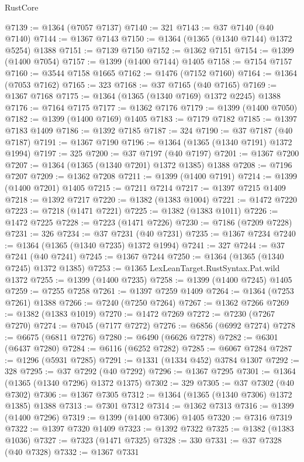\begin{lexlean}{RustCore}
\begin{coremodule}
@7139 := @1364 (@7057 @7137)
@7140 := 321
@7143 := @37 @7140 (@40 @7140)
@7144 := @1367 @7143
@7150 := @1364 (@1365 (@1340 @7144) @1372 @5254) @1388
@7151 := @7139 @7150
@7152 := @1362 @7151
@7154 := @1399 (@1400 @7054)
@7157 := @1399 (@1400 @7144) @1405
@7158 := @7154 @7157
@7160 := @3544 @7158 @1665
@7162 := @1476 (@7152 @7160)
@7164 := @1364 (@7053 @7162)
@7165 := 323
@7168 := @37 @7165 (@40 @7165)
@7169 := @1367 @7168
@7175 := @1364 (@1365 (@1340 @7169) @1372 @2245) @1388
@7176 := @7164 @7175
@7177 := @1362 @7176
@7179 := @1399 (@1400 @7050)
@7182 := @1399 (@1400 @7169) @1405
@7183 := @7179 @7182
@7185 := @1397 @7183 @1409
@7186 := @1392 @7185
@7187 := 324
@7190 := @37 @7187 (@40 @7187)
@7191 := @1367 @7190
@7196 := @1364 (@1365 (@1340 @7191) @1372 @1994)
@7197 := 325
@7200 := @37 @7197 (@40 @7197)
@7201 := @1367 @7200
@7207 := @1364 (@1365 (@1340 @7201) @1372 @1385) @1388
@7208 := @7196 @7207
@7209 := @1362 @7208
@7211 := @1399 (@1400 @7191)
@7214 := @1399 (@1400 @7201) @1405
@7215 := @7211 @7214
@7217 := @1397 @7215 @1409
@7218 := @1392 @7217
@7220 := @1382 (@1383 @1004)
@7221 := @1472 @7220
@7223 := @7218 (@1471 @7221)
@7225 := @1382 (@1383 @1011)
@7226 := @1472 @7225
@7228 := @7223 (@1471 @7226)
@7230 := @7186 (@7209 @7228)
@7231 := 326
@7234 := @37 @7231 (@40 @7231)
@7235 := @1367 @7234
@7240 := @1364 (@1365 (@1340 @7235) @1372 @1994)
@7241 := 327
@7244 := @37 @7241 (@40 @7241)
@7245 := @1367 @7244
@7250 := @1364 (@1365 (@1340 @7245) @1372 @1385)
@7253 := @1365 LexLeanTarget.RustSyntax.Pat.wild @1372
@7255 := @1399 (@1400 @7235)
@7258 := @1399 (@1400 @7245) @1405
@7259 := @7255 @7258
@7261 := @1397 @7259 @1409
@7264 := @1364 (@7253 @7261) @1388
@7266 := @7240 (@7250 @7264)
@7267 := @1362 @7266
@7269 := @1382 (@1383 @1019)
@7270 := @1472 @7269
@7272 := @7230 (@7267 @7270)
@7274 := @7045 (@7177 @7272)
@7276 := @6856 (@6992 @7274)
@7278 := @6675 (@6811 @7276)
@7280 := @6490 (@6626 @7278)
@7282 := @6301 (@6437 @7280)
@7284 := @6116 (@6252 @7282)
@7285 := @6067 @7284
@7287 := @1296 (@5931 @7285)
@7291 := @1331 (@1334 @452) @3784 @1307
@7292 := 328
@7295 := @37 @7292 (@40 @7292)
@7296 := @1367 @7295
@7301 := @1364 (@1365 (@1340 @7296) @1372 @1375)
@7302 := 329
@7305 := @37 @7302 (@40 @7302)
@7306 := @1367 @7305
@7312 := @1364 (@1365 (@1340 @7306) @1372 @1385) @1388
@7313 := @7301 @7312
@7314 := @1362 @7313
@7316 := @1399 (@1400 @7296)
@7319 := @1399 (@1400 @7306) @1405
@7320 := @7316 @7319
@7322 := @1397 @7320 @1409
@7323 := @1392 @7322
@7325 := @1382 (@1383 @1036)
@7327 := @7323 (@1471 @7325)
@7328 := 330
@7331 := @37 @7328 (@40 @7328)
@7332 := @1367 @7331

\end{coremodule}
\end{lexlean}
